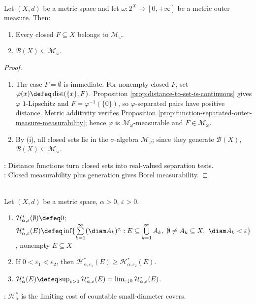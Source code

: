 \begin{theorem} \label{thm:metric-outer-measure-borel-measurable} \\
Let $(X,d)$ be a metric space and let $\omega:2^X\to[0,+\infty]$ be a metric outer measure. Then:
\begin{enumerate}[label=(\roman*)]
\setlength{\itemsep}{0pt}
\item Every closed $F\subseteq X$ belongs to $\mathcal{M}_\omega$.
\item $\mathcal{B}(X)\subseteq\mathcal{M}_\omega$.
\end{enumerate}
\begin{proof}
\begin{enumerate}[label=(\roman*)]
\setlength{\itemsep}{0pt}
\item The case $F=\emptyset$ is immediate. For nonempty closed $F$, set $\varphi(x)\defeq\operatorname{dist}(\{x\},F)$. Proposition \ref{prop:distance-to-set-is-continuous} gives $\varphi$ $1$-Lipschitz and $F=\varphi^{-1}(\{0\})$, so $\varphi$-separated pairs have positive distance. Metric additivity verifies Proposition \ref{prop:function-separated-outer-measure-measurability}; hence $\varphi$ is $\mathcal{M}_\omega$-measurable and $F\in\mathcal{M}_\omega$.
\item By (i), all closed sets lie in the $\sigma$-algebra $\mathcal{M}_\omega$; since they generate $\mathcal{B}(X)$, $\mathcal{B}(X)\subseteq\mathcal{M}_\omega$.
\end{enumerate}
: Distance functions turn closed sets into real-valued separation tests.\\
: Closed measurability plus generation gives Borel measurability.
\end{proof}
\end{theorem}

\begin{definition} \label{def:hausdorff-outer-measure} \\
Let $(X,d)$ be a metric space, $\alpha>0$, $\varepsilon>0$.
\begin{enumerate}[label=(\roman*)]
\setlength{\itemsep}{0pt}
\item $\mathcal{H}_{\alpha,\varepsilon}^\ast(\emptyset)\defeq0$; $\mathcal{H}_{\alpha,\varepsilon}^\ast(E)\defeq\inf\{\sum\limits_{k=1}^{\infty}(\diam A_k)^\alpha:E\subseteq\bigcup\limits_{k=1}^{\infty}A_k,\ \emptyset\neq A_k\subseteq X,\ \diam A_k<\varepsilon\}$, nonempty $E\subseteq X$
\item If $0<\varepsilon_1<\varepsilon_2$, then $\mathcal{H}_{\alpha,\varepsilon_1}^\ast(E)\geq\mathcal{H}_{\alpha,\varepsilon_2}^\ast(E)$.
\item $\mathcal{H}_\alpha^\ast(E)\defeq\sup_{\varepsilon>0}\mathcal{H}_{\alpha,\varepsilon}^\ast(E)=\lim_{\varepsilon\downarrow0}\mathcal{H}_{\alpha,\varepsilon}^\ast(E)$.
\end{enumerate}
: $\mathcal{H}_\alpha^\ast$ is the limiting cost of countable small-diameter covers.
\end{definition}

